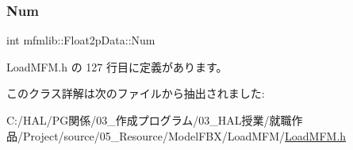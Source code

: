 \subsubsection{\texorpdfstring{Num}{Num}}
{\footnotesize\ttfamily int mfmlib\+::\+Float2p\+Data\+::\+Num}



 Load\+M\+F\+M.\+h の 127 行目に定義があります。



このクラス詳解は次のファイルから抽出されました\+:\begin{DoxyCompactItemize}
\item 
C\+:/\+H\+A\+L/\+P\+G関係/03\+\_\+作成プログラム/03\+\_\+\+H\+A\+L授業/就職作品/\+Project/source/05\+\_\+\+Resource/\+Model\+F\+B\+X/\+Load\+M\+F\+M/\mbox{\hyperlink{_load_m_f_m_8h}{Load\+M\+F\+M.\+h}}\end{DoxyCompactItemize}
